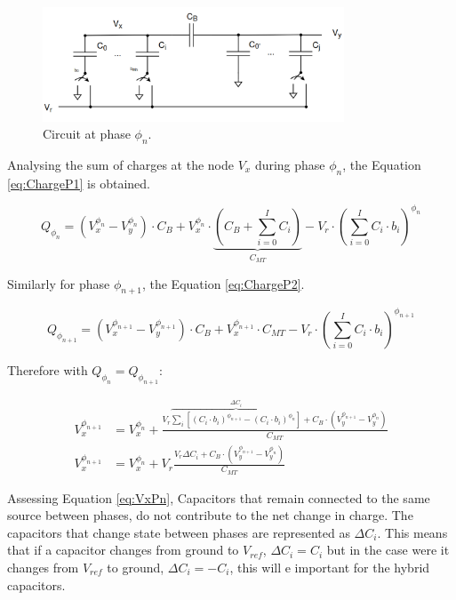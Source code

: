 \begin{figure}[H]

    \centering
    \includegraphics*[width=0.8\textwidth]{Images/DACCircPn.png}
    \caption{Circuit at phase $\phi_n$.}

    \label{fig:P1_Circ}
\end{figure}


Analysing the sum of charges at the node $V_x$ during phase $\phi_n$, the Equation \ref{eq:ChargeP1} is obtained.

\begin{equation}
    Q_{\phi_n} = (V_x^{\phi_n}-V_y^{\phi_n})\cdot C_B + V_x^{\phi_n}\cdot \underbrace{ \left ( C_B + \sum_{i=0}^{I}C_i \right )}_{C_{MT}}-V_r\cdot \left ( \sum_{i=0}^{I} C_i\cdot b_i \right )^{\phi_n}
    \label{eq:ChargeP1}
\end{equation}

Similarly for phase $\phi_{n+1}$, the Equation \ref{eq:ChargeP2}.

\begin{equation}
    Q_{\phi_{n+1}} = (V_x^{\phi_{n+1}}-V_y^{\phi_{n+1}})\cdot C_B + V_x^{\phi_{n+1}}\cdot C_{MT}-V_r\cdot \left ( \sum_{i=0}^{I} C_i\cdot b_i \right )^{\phi_{n+1}}
    \label{eq:ChargeP2}
\end{equation}

Therefore with $Q_{\phi_{n}}=Q_{\phi_{n+1}}$:

\begin{equation}
    \begin{split}
        V_x^{\phi_{n+1}} &= V_x^{\phi_{n}} +  \frac{ V_r\overbrace{\sum_{i}\left[ (C_i\cdot b_i)^{\phi_{n+1}} - (C_i\cdot b_i)^{\phi_{n}}\right]}^{\Delta C_i}+C_B\cdot \left(V_y^{\phi_{n+1}}-V_y^{\phi_{n}}\right)}{C_{MT}} \\
        V_x^{\phi_{n+1}} &= V_x^{\phi_{n}} + V_r \frac{ V_r \Delta C_i +C_B\cdot \left(V_y^{\phi_{n+1}}-V_y^{\phi_{n}}\right)}{C_{MT}}
    \end{split}
    \label{eq:VxPn}
\end{equation}

Assessing Equation \ref{eq:VxPn}, Capacitors that remain connected to the same source between phases, do not contribute to the net change in charge. The capacitors that change state between phases are represented as $\Delta C_i$. This means that if a capacitor changes from ground to $V_{ref}$, $\Delta C_i = C_i$ but in the case were it changes from $V_{ref}$ to ground,  $\Delta C_i = -C_i$, this will e important for the hybrid capacitors.

